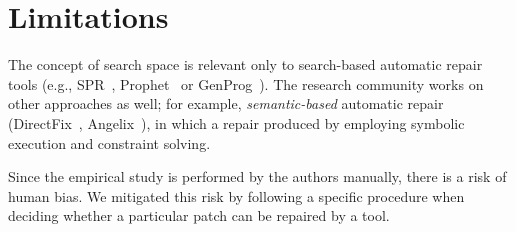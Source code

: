 \section{Limitations}

The concept of search space is relevant only to search-based automatic repair tools (e.g., SPR~\cite{long2015staged}, Prophet~\cite{long2015prophet} or GenProg~\cite{le2012systematic}). The research community works on other approaches as well; for example, \emph{semantic-based} automatic repair (DirectFix~\cite{directfix}, Angelix~\cite{mechtaev2016angelix}), in which a repair produced by employing symbolic execution and constraint solving.


Since the empirical study is performed by the authors manually, there is a risk of human bias. We mitigated this risk by following a specific procedure when deciding whether a particular patch can be repaired by a tool.
